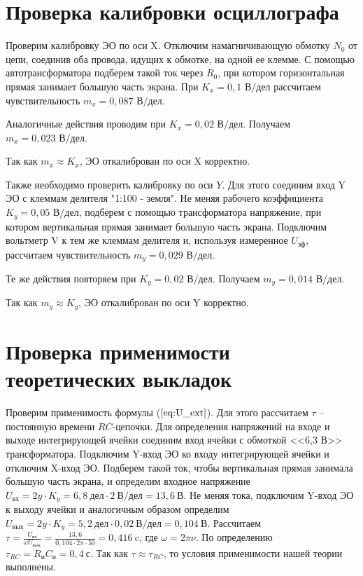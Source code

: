 \documentclass[a4paper,12pt]{article} %
\begin{document}
\section{Проверка калибровки осциллографа}

Проверим калибровку ЭО по оси X. Отключим намагничивающую обмотку $N_0$ от цепи, соединив оба провода, идущих к обмотке, на одной ее клемме. С помощью автотрансформатора подберем такой ток через $R_0$, при котором горизонтальная прямая занимает большую часть экрана. При $ K_x=0,1 \text{ В/дел} $ рассчитаем чувствительность $m_x=0,087 \text{ В/дел}$.

Аналогичные действия проводим при $ K_x =0,02 \text{ В/дел} $. Получаем $ m_x=0,023 \text{ В/дел} $.

Так как $m_x \approx K_x$, ЭО откалиброван по оси X корректно.

Также необходимо проверить калибровку по оси $ Y $. Для этого соединим вход Y ЭО с клеммам делителя "1:100 - земля". Не меняя рабочего коэффициента $K_y = 0,05\text{ В/дел}$, подберем с помощью трансформатора напряжение, при котором вертикальная прямая занимает большую часть экрана. Подключим вольтметр V к тем же клеммам делителя и, используя измеренное $U_{\text{эф}}$, рассчитаем чувствительность $m_y=0,029\text{ В/дел}$.

Те же действия повторяем при $K_y = 0,02\text{ В/дел}$. Получаем $m_y=0,014\text{ В/дел}$.

Так как $m_y \approx K_y$, ЭО откалиброван по оси Y корректно.

\section{Проверка применимости теоретических выкладок}

Проверим применимость формулы ($\ref{eq:U_ext}$). Для этого рассчитаем $\tau$ -- постоянную времени $ RC $-цепочки. Для определения напряжений на входе и выходе интегрирующей ячейки соединим вход ячейки с обмоткой <<6,3 В>> трансформатора. Подключим Y-вход ЭО ко входу интегрирующей ячейки и отключим X-вход ЭО. Подберем такой ток, чтобы вертикальная прямая занимала большую часть экрана, и определим входное напряжение $U_{\text{вх}}=2y\cdot K_y=6,8\ \text{дел} \cdot 2\ \text{В/дел}=13,6\ \text{В}$. Не меняя тока, подключим Y-вход ЭО к выходу ячейки и аналогичным образом определим $U_{\text{вых}}=2y\cdot K_y=5,2\ \text{дел} \cdot 0,02\ \text{В/дел}=0,104\ \text{В}$. Рассчитаем $\tau=\frac{U_{\text{вх}}}{\omega U_{\text{вых}}}=\frac{13,6}{0,104\cdot2\pi\cdot 50}=0,416\ \text{c}$, где $\omega=2\pi\nu$. По определению $\tau_{RC}=R_\text{и}C_\text{и}=0,4\ \text{с}$. Так как $\tau\approx\tau_{RC}$, то условия применимости нашей теории выполнены.
\end{document}
